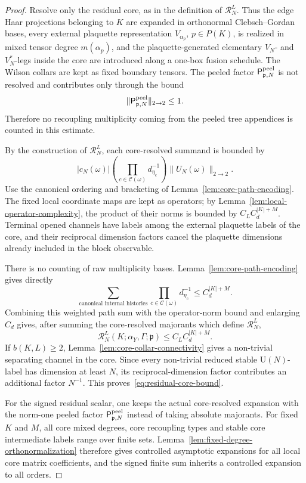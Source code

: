 \documentclass[11pt,a4paper,reqno]{amsart}
\theoremstyle{definition}
\theoremstyle{remark}
\newcommand\U{{\mathrm U}}
\begin{document}
\begin{proof}
Resolve only the residual core, as in the definition of $\mathcal R_N^L$.  Thus the edge Haar projections belonging to $K$ are expanded in orthonormal Clebsch--Gordan bases, every external plaquette representation $V_{\alpha_p}$, $p\in P(K)$, is realized in mixed tensor degree $m(\alpha_p)$, and the plaquette-generated elementary $V_N$- and $V_N^*$-legs inside the core are introduced along a one-box fusion schedule.  The Wilson collars are kept as fixed boundary tensors.  The peeled factor $\mathsf P^{\rm peel}_{\mathfrak p,N}$ is not resolved and contributes only through the bound
\[
\|\mathsf P^{\rm peel}_{\mathfrak p,N}\|_{2\to2}\le1 .
\]
Therefore no recoupling multiplicity coming from the peeled tree appendices is counted in this estimate.

By the construction of $\mathcal R_N^L$, each core-resolved summand is bounded by
\[
|c_N(\omega)|
\left(\prod_{c\in\mathcal C(\omega)}d_{\eta_c}^{-1}\right)
\|U_N(\omega)\|_{2\to2}.
\]
Use the canonical ordering and bracketing of Lemma~\ref{lem:core-path-encoding}.  The fixed local coordinate maps are kept as operators; by Lemma~\ref{lem:local-operator-complexity}, the product of their norms is bounded by $C_LC_d^{|K|+M}$.  Terminal opened channels have labels among the external plaquette labels of the core, and their reciprocal dimension factors cancel the plaquette dimensions already included in the block observable.

There is no counting of raw multiplicity bases.  Lemma~\ref{lem:core-path-encoding} gives directly
\[
\sum_{\text{canonical internal histories}}
\prod_{c\in\mathcal C(\omega)}d_{\eta_c}^{-1}
\le C_d^{|K|+M}.
\]
Combining this weighted path sum with the operator-norm bound and enlarging $C_d$ gives, after summing the core-resolved majorants which define $\mathcal R_N^L$,
\[
\mathcal R_N^L(K;\alpha_Y,\Gamma;\mathfrak p)
\le C_LC_d^{|K|+M}.
\]
If $b(K,L)\ge2$, Lemma~\ref{lem:core-collar-connectivity} gives a non-trivial separating channel in the core. Since every non-trivial reduced stable $\U(N)$-label has dimension at least $N$, its reciprocal-dimension factor contributes an additional factor $N^{-1}$. This proves~\eqref{eq:residual-core-bound}.

For the signed residual scalar, one keeps the actual core-resolved expansion with the norm-one peeled factor $\mathsf P^{\rm peel}_{\mathfrak p,N}$ instead of taking absolute majorants.  For fixed $K$ and $M$, all core mixed degrees, core recoupling types and stable core intermediate labels range over finite sets. Lemma~\ref{lem:fixed-degree-orthonormalization} therefore gives controlled asymptotic expansions for all local core matrix coefficients, and the signed finite sum inherits a controlled expansion to all orders.
\end{proof}
\end{document}
